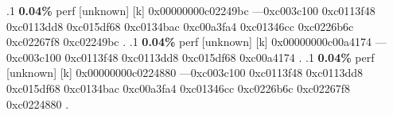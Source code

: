 \begin{profile}
{.1 \textbf{ 0.04\%} perf             [unknown]              [k] 0x00000000c02249bc\newline {} ---0xc003c100\newline {} 0xc0113f48\newline {} 0xc0113dd8\newline {} 0xc015df68\newline {} 0xc0134bac\newline {} 0xc00a3fa4\newline {} 0xc01346cc\newline {} 0xc0226b6c\newline {} 0xc02267f8\newline {} 0xc02249bc\newline {} . 
.1 \textbf{ 0.04\%} perf             [unknown]              [k] 0x00000000c00a4174\newline {} ---0xc003c100\newline {} 0xc0113f48\newline {} 0xc0113dd8\newline {} 0xc015df68\newline {} 0xc00a4174\newline {} . 
.1 \textbf{ 0.04\%} perf             [unknown]              [k] 0x00000000c0224880\newline {} ---0xc003c100\newline {} 0xc0113f48\newline {} 0xc0113dd8\newline {} 0xc015df68\newline {} 0xc0134bac\newline {} 0xc00a3fa4\newline {} 0xc01346cc\newline {} 0xc0226b6c\newline {} 0xc02267f8\newline {} 0xc0224880\newline {} . 
}
\end{profile}
